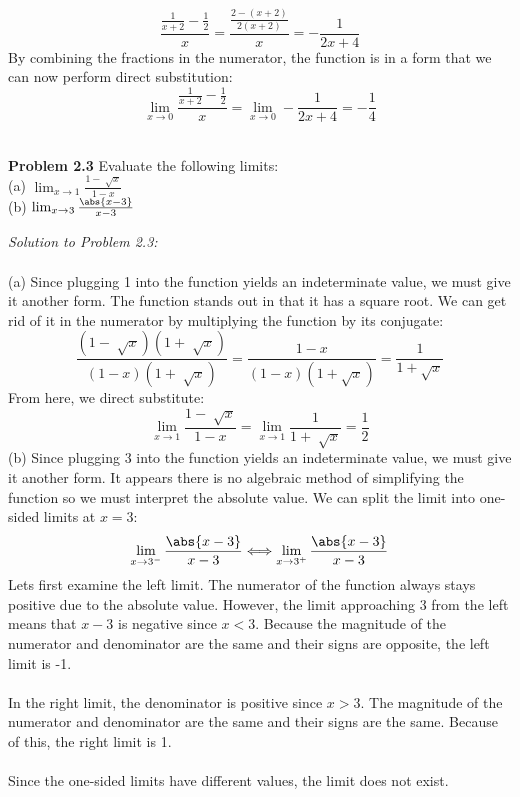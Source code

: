 \documentclass[11pt]{scrartcl}
\begin{document}
$$\frac{\frac{1}{x+2}-\frac{1}{2}}{x}=\frac{\frac{2-(x+2)}{2(x+2)}}{x}=-\frac{1}{2x+4}$$
\noindent
By combining the fractions in the numerator, the function is in a form that we can now perform direct substitution:
$$\lim_{x \to 0} \frac{\frac{1}{x+2}-\frac{1}{2}}{x}=\lim_{x \to 0} -\frac{1}{2x+4}=-\frac{1}{4}$$
\noindent
\\
\begin{tcolorbox}
[colback=purple!5!white,colframe=purple!75!black]
\textbf{Problem 2.3} Evaluate the following limits:\\

(a) $\lim_{x \to 1} \frac{1-\sqrt[]{x}}{1-x}$\\

(b) $\lim_{x \to 3} \frac{\abs{x-3}}{x-3}$
\end{tcolorbox}
\noindent
\textit{Solution to Problem 2.3:}\\
\noindent
\\
(a) Since plugging 1 into the function yields an indeterminate value, we must give it another form. The function stands out in that it has a square root. We can get rid of it in the numerator by multiplying the function by its conjugate: 
$$\frac{(1-\sqrt[]{x})(1+\sqrt[]{x})}{(1-x)(1+\sqrt[]{x})}=\frac{1-x}{(1-x)(1+\sqrt x)}=\frac{1}{1+\sqrt x}$$
\noindent
From here, we direct substitute:
$$\lim_{x \to 1} \frac{1-\sqrt[]{x}}{1-x}=\lim_{x \to 1} \frac{1}{1+\sqrt[]{x}}=\frac{1}{2}$$
\noindent
(b) Since plugging 3 into the function yields an indeterminate value, we must give it another form. It appears there is no algebraic method of simplifying the function so we must interpret the absolute value. We can split the limit into one-sided limits at $x=3$:
$$\lim\limits_{x \to 3^{-}} \frac{\abs{x-3}}{x-3} \Longleftrightarrow \lim\limits_{x \to 3^{+}} \frac{\abs{x-3}}{x-3}$$
Lets first examine the left limit. The numerator of the function always stays positive due to the absolute value. However, the limit approaching 3 from the left means that $x-3$ is negative since $x<3$. Because the magnitude of the numerator and denominator are the same and their signs are opposite, the left limit is -1.\\
\noindent
\\
In the right limit, the denominator is positive since $x>3$.
The magnitude of the numerator and denominator are the same and their signs are the same. Because of this, the right limit is 1.\\
\noindent
\\
Since the one-sided limits have different values, the limit does not exist. \\
\end{document}
